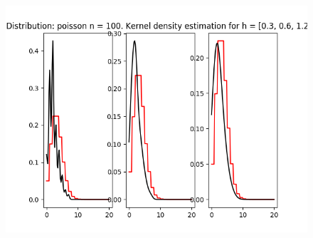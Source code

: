 \documentclass[12pt]{article}
\begin{document}
\begin{center}
\begin{figure}[H]
\includegraphics[width=\textwidth]{kernel/d_poisson100.png}
\end{figure}


\end{center}
\end{document}
